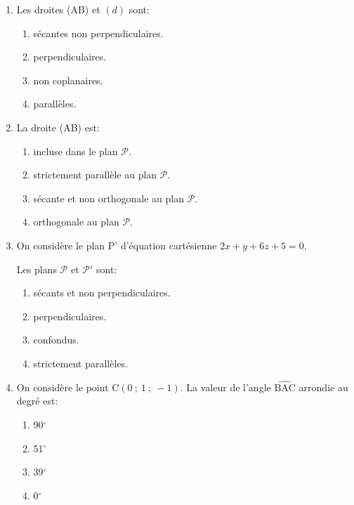 \documentclass[10pt]{article}
\begin{document}
\medskip
\begin{enumerate}
\item Les droites (AB) et $(d)$ sont:
	\begin{enumerate}
		\item sécantes non perpendiculaires. 
		\item  perpendiculaires.
		\item non coplanaires.
		\item parallèles.
	\end{enumerate}
\item La droite (AB) est:
	\begin{enumerate}
		\item incluse dans le plan $\mathcal{P}$.
		\item strictement parallèle au plan $\mathcal{P}$.
		\item sécante et non orthogonale au plan $\mathcal{P}$.
		\item orthogonale au plan $\mathcal{P}$.
	\end{enumerate}
\item On considère le plan P' d'équation cartésienne $2x+y+6z+5 = 0$. 

Les plans $\mathcal{P}$ et $\mathcal{P}'$ sont:
	\begin{enumerate}
		\item sécants et non perpendiculaires.
		\item perpendiculaires.
		\item confondus.
		\item strictement parallèles.
	\end{enumerate}
\item On considère le point C$(0~;~1~;~-1)$. La valeur de l'angle $\widehat{\text{BAC}}$ arrondie au degré est: 
	\begin{enumerate}
		\item 90\ensuremath{^\circ}
		\item 51\ensuremath{^\circ}
		\item 39\ensuremath{^\circ}
		\item 0\ensuremath{^\circ}
	\end{enumerate}
\end{enumerate}

\bigskip
\end{document}

